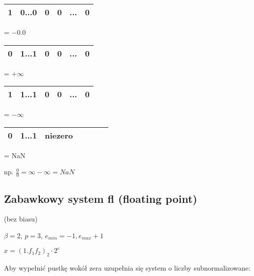 \documentclass[hidelinks,a4paper,fleqn]{article}
\begin{document}
\begin{tabular}{|c|c|l|l|l|c|c|c|l|c|}
	\hline
	1 & \multicolumn{4}{c|}{0...0} & 0 & 0 & \multicolumn{2}{c|}{...} & 0 \\ \hline
\end{tabular} = $-0.0$

\begin{tabular}{|c|c|l|l|l|c|c|c|l|c|}
	\hline
	0 & \multicolumn{4}{c|}{1...1} & 0 & 0 & \multicolumn{2}{c|}{...} & 0 \\ \hline
\end{tabular} = $+\infty$

\begin{tabular}{|c|c|l|l|l|c|c|c|l|c|}
	\hline
	1 & \multicolumn{4}{c|}{1...1} & 0 & 0 & \multicolumn{2}{c|}{...} & 0 \\ \hline
\end{tabular} = $-\infty$

\begin{tabular}{|c|c|l|l|l|c|c|c|l|c|}
	\hline
	0 & \multicolumn{4}{c|}{1...1} & niezero \\ \hline
\end{tabular} = NaN

np. $\frac{0}{0} = \infty - \infty = NaN$

\subsection{Zabawkowy system fl (floating point)}

(bez biasu)

$\beta = 2$, $p = 3$, $e_{min} = -1, e_{max} + 1$

$x = (1.f_1f_2)_2 \cdot 2^{e}$



Aby wypełnić pustkę wokół zera uzupełnia się system o liczby subnormalizowane:
\end{document}

